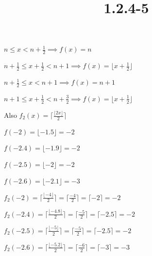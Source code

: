 \documentclass{article}
\title{1.2.4-5}
\begin{document}
\maketitle

$n \leq x < n + \frac{1}{2} \implies f(x) = n$

$n + \frac{1}{2} \leq x + \frac{1}{2} < n + 1 \implies f(x) = \lfloor x + \frac{1}{2} \rfloor$

$n + \frac{1}{2} \leq x < n + 1 \implies f(x) = n + 1$

$n + 1 \leq x + \frac{1}{2} < n + \frac{3}{2} \implies f(x) = \lfloor x + \frac{1}{2} \rfloor$

Also $f_2(x)=\lceil\frac{\lfloor{2x}\rfloor}{2}\rceil$

$f(-2) = \lfloor -1.5 \rfloor = -2$

$f(-2.4) = \lfloor -1.9 \rfloor = -2$

$f(-2.5) = \lfloor -2 \rfloor = -2$

$f(-2.6) = \lfloor -2.1 \rfloor = -3$

$f_2(-2) = \lceil\frac{\lfloor{-4}\rfloor}{2}\rceil = \lceil\frac{-4}{2}\rceil = \lceil -2 \rceil = -2$

$f_2(-2.4) = \lceil\frac{\lfloor{-4.8}\rfloor}{2}\rceil = \lceil\frac{-5}{2}\rceil = \lceil -2.5 \rceil = -2$

$f_2(-2.5) = \lceil\frac{\lfloor{-5}\rfloor}{2}\rceil = \lceil\frac{-5}{2}\rceil = \lceil -2.5 \rceil = -2$

$f_2(-2.6) = \lceil\frac{\lfloor{-5.2}\rfloor}{2}\rceil = \lceil\frac{-6}{2}\rceil = \lceil -3 \rceil = -3$
\end{document}
